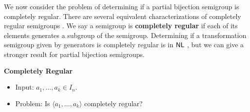 \documentclass{amsart}
\newcommand{\NL}{\ensuremath\mathsf{NL}}
\theoremstyle{remark}
\numberwithin{equation}{section}
\begin{document}
We now consider the problem of determining if a partial bijection semigroup is completely regular. There are several equivalent characterizations of completely regular semigroups \cite[Prop 4.1.1]{HO:FST}. We say a semigroup is {\bf completely regular} if each of its elements generates a subgroup of the semigroup. Determining if a transformation semigroup given by generators is completely regular is in $\NL$ \cite[Thm 5.6]{FJ:CP}, but we can give a stronger result for partial bijection semigroups.

\medskip
{\bf Completely Regular}
\begin{itemize}
\item Input: $a_1,\dots,a_k \in I_n$.
\item Problem: Is $\langle a_1,\dots,a_k\rangle$ completely regular?
\end{itemize}
\end{document}
